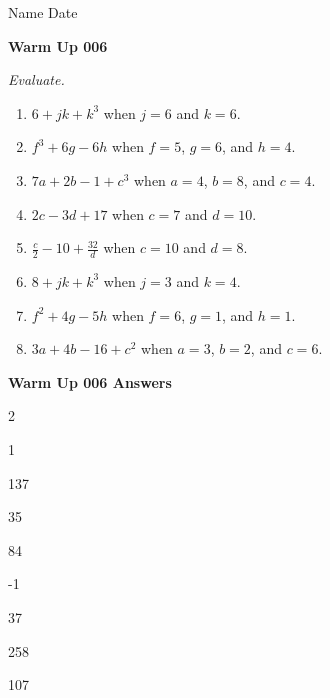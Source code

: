 \documentclass[twocolumn,12pt]{article}
\begin{document}
\noindent Name \makebox[3.5cm]{\hrulefill} \hfill Date \makebox[2cm]{\hrulefill} \par
\vspace*{0.1in}
\noindent \Large \textbf{Warm Up 006} \normalsize \par \textit{Evaluate.}\par
\begin{enumerate}


\item \(6+jk+k^{3}\) when \(j=6\) and \(k=6\).\vfill



\item \(f^{3}+6g-6h\) when \(f=5\), \(g=6\), and \(h=4\).\vfill



\item \(7a+2b-1+c^{3}\) when \(a=4\), \(b=8\), and \(c=4\).\vfill



\item \(2c-3d+17\) when \(c=7\) and \(d=10\).\vfill



\item \(\displaystyle \frac{c}{2}-10+\frac{32}{d}\) when \(c=10\) and \(d=8\).\vfill



\item \(8+jk+k^{3}\) when \(j=3\) and \(k=4\).\vfill



\item \(f^{2}+4g-5h\) when \(f=6\), \(g=1\), and \(h=1\).\vfill



\item \(3a+4b-16+c^{2}\) when \(a=3\), \(b=2\), and \(c=6\).\vfill











\end{enumerate}
\newpage


\normalsize \textbf{Warm Up 006 Answers} 
\begin{enumerate}[A. ]
\begin{multicols}{2}
\item 1 \vfill
\item 137 \vfill
\item 35 \vfill
\item 84 \vfill
\item -1 \vfill
\item 37 \vfill
\item 258 \vfill
\item 107 \vfill













\end{multicols}
\end{enumerate}
\newpage
\end{document}

